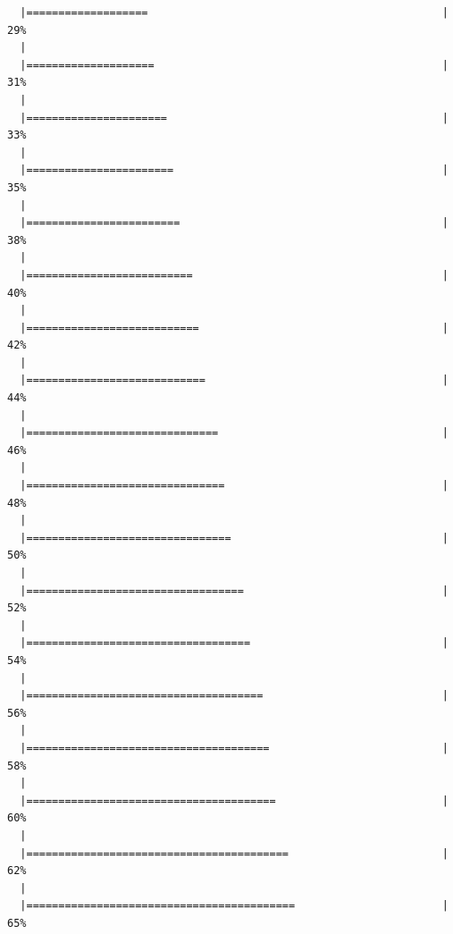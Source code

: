\documentclass[]{book}
\begin{document}
\begin{verbatim}
  |===================                                              |  29%
  |                                                                       
  |====================                                             |  31%
  |                                                                       
  |======================                                           |  33%
  |                                                                       
  |=======================                                          |  35%
  |                                                                       
  |========================                                         |  38%
  |                                                                       
  |==========================                                       |  40%
  |                                                                       
  |===========================                                      |  42%
  |                                                                       
  |============================                                     |  44%
  |                                                                       
  |==============================                                   |  46%
  |                                                                       
  |===============================                                  |  48%
  |                                                                       
  |================================                                 |  50%
  |                                                                       
  |==================================                               |  52%
  |                                                                       
  |===================================                              |  54%
  |                                                                       
  |=====================================                            |  56%
  |                                                                       
  |======================================                           |  58%
  |                                                                       
  |=======================================                          |  60%
  |                                                                       
  |=========================================                        |  62%
  |                                                                       
  |==========================================                       |  65%

\end{verbatim}
\end{document}
